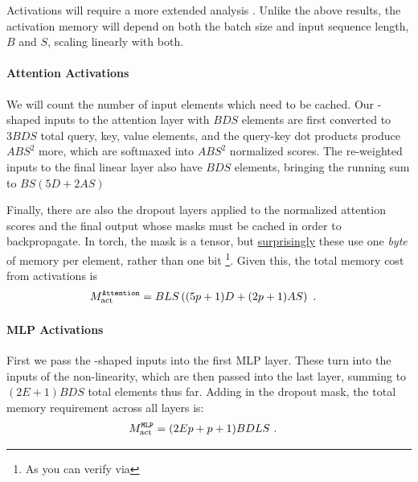 \documentclass[11pt]{article}
\begin{document}
Activations will require a more extended analysis \cite{korthikanti2022reducing}. Unlike the above
results, the activation memory will depend on both the batch size and input sequence length, $ B $
and $ S $, scaling linearly with both.



\paragraph{Attention Activations}

We will count the number of input elements which need to be cached. Our -shaped inputs
to the attention layer with $ BDS $ elements are first converted to $ 3BDS $ total query, key, value
elements, and the query-key dot products produce $ ABS ^{ 2 } $ more, which are softmaxed into $ ABS
^{ 2 } $ normalized scores. The re-weighted inputs to the final linear layer also have $ BDS $
elements, bringing the running sum to $ BS \left ( 5D + 2AS  \right ) $

Finally, there are also the dropout layers applied to the normalized attention scores and the final
output whose masks must be cached in order to
backpropagate. In torch, the mask is a  tensor, but
\href{https://github.com/pytorch/pytorch/issues/41571}{surprisingly} these use one \textit{byte} of
memory per element, rather than one bit \footnote{As you can verify
via }.
Given this, the total memory cost from activations is
\begin{align}
M _{ \rm act  } ^\texttt{Attention} &= BLS \left ( (5p+1)D + (2p+1)AS  \right ) \ .
\label{eq_att_actmem_vanilla}
\end{align}




\paragraph{MLP Activations}

 First we pass the -shaped inputs into the first MLP layer. These turn into the
  inputs of the non-linearity, which are then passed into the last
  layer, summing to $ (2E+1)BDS $ total elements thus far. Adding in the dropout
 mask, the total memory requirement across all  layers is:
\begin{align}
M _{ \rm act  } ^\texttt{MLP} &= (2Ep+p+1)BDLS\ .
\label{eq_mlp_actmem_vanilla}
\end{align}
\end{document}
